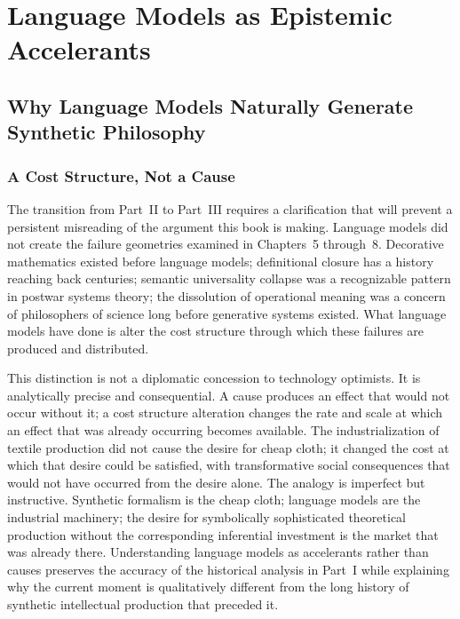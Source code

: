\documentclass[12pt, openright, twoside]{book}
\begin{document}
\clearpage

\part{Language Models as Epistemic Accelerants}

\chapter{Why Language Models Naturally Generate Synthetic Philosophy}

\section{A Cost Structure, Not a Cause}

The transition from Part~II to Part~III requires a clarification
that will prevent a persistent misreading of the argument this
book is making. Language models did not create the failure
geometries examined in Chapters~5 through~8. Decorative
mathematics existed before language models; definitional closure
has a history reaching back centuries; semantic universality
collapse was a recognizable pattern in postwar systems theory;
the dissolution of operational meaning was a concern of
philosophers of science long before generative systems existed.
What language models have done is alter the cost structure
through which these failures are produced and distributed.

This distinction is not a diplomatic concession to technology
optimists. It is analytically precise and consequential. A
cause produces an effect that would not occur without it; a
cost structure alteration changes the rate and scale at which
an effect that was already occurring becomes available. The
industrialization of textile production did not cause the
desire for cheap cloth; it changed the cost at which that
desire could be satisfied, with transformative social
consequences that would not have occurred from the desire
alone. The analogy is imperfect but instructive. Synthetic
formalism is the cheap cloth; language models are the
industrial machinery; the desire for symbolically sophisticated
theoretical production without the corresponding inferential
investment is the market that was already there. Understanding
language models as accelerants rather than causes preserves
the accuracy of the historical analysis in Part~I while
explaining why the current moment is qualitatively different
from the long history of synthetic intellectual production
that preceded it.
\end{document}
